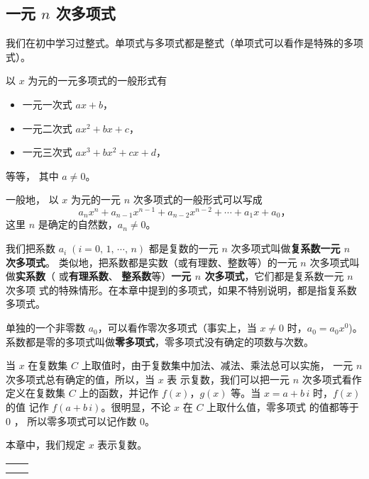 \subsection{一元 $n$ 次多项式}\label{subsec:1-1}

我们在初中学习过整式。单项式与多项式都是整式（单项式可以看作是特殊的多项式）。

以 $x$ 为元的一元多项式的一般形式有
\begin{itemize}[nosep, left=2cm, label=]
    \item 一元一次式 \quad $ax + b$，
    \item 一元二次式 \quad $ax^2 + bx + c$，
    \item 一元三次式 \quad $ax^3 + bx^2 + cx + d$，
\end{itemize}
等等， 其中 $a \neq 0$。

一般地， 以 $x$ 为元的一元 $n$ 次多项式的一般形式可以写成
$$ a_nx^n + a_{n-1}x^{n-1} + a_{n-2}x^{n-2} + \cdots + a_1x + a_0 \text{，} $$
这里 $n$ 是确定的自然数，$a_n \neq 0$。

我们把系数 $a_i \; (i = 0,\, 1,\, \cdots,\, n)$ 都是复数的一元 $n$ 次多项式叫做\textbf{复系数一元 $n$ 次多项式}。
类似地，把系数都是实数（或有理数、整数等）的一元 $n$ 次多项式叫做\textbf{实系数}（ 或\textbf{有理系数}、
\textbf{整系数}等）\textbf{一元 $n$ 次多项式}，它们都是复系数一元 $n$ 次多项
式的特殊情形。在本章中提到的多项式，如果不特别说明，都是指复系数多项式。


单独的一个非零数 $a_0$，可以看作零次多项式（事实上，当 $x \neq 0$ 时，$a_0 = a_0 x^0$)。
系数都是零的多项式叫做\textbf{零多项式}，零多项式没有确定的项数与次数。


当 $x$ 在复数集 $C$ 上取值时，由于复数集中加法、减法、乘法总可以实施，
一元 $n$ 次多项式总有确定的值，所以，当 $x$ 表
示复数，我们可以把一元 $n$ 次多项式看作定义在复数集 $C$
上的函数，并记作 $f(x)$，$g(x)$ 等。当 $x = a + b\,i$ 时，$f(x)$ 的值
记作 $f(a + b\,i)$。很明显，不论 $x$ 在 $C$ 上取什么值，零多项式
的值都等于 $0$ ， 所以零多项式可以记作数 $0$。

本章中，我们规定 $x$ 表示复数。


\lianxi
\begin{xiaotis}

\begin{xiaoxiaotis}

    \renewcommand\arraystretch{1.2}
    \begin{tabular}[t]{*{2}{@{}p{16em}}}
         &  \\[1em]
         & 
    \end{tabular}

\end{xiaoxiaotis}



\end{xiaotis}

